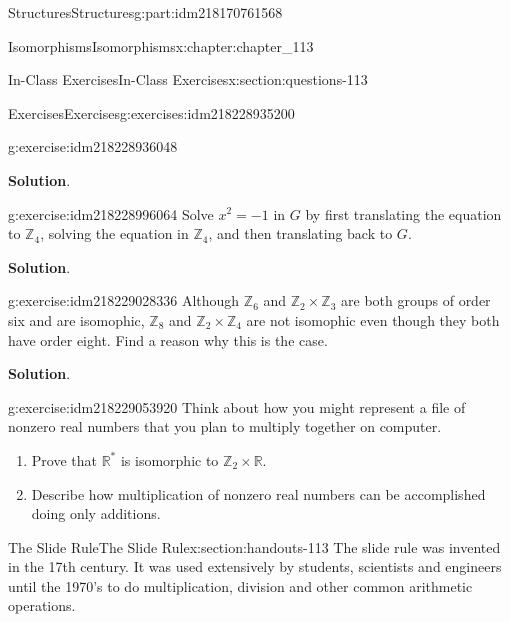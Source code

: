 \documentclass[oneside,10pt,]{book}
\newcommand{\blocktitlefont}{\relax}
\numberwithin{equation}{section}
\begin{document}
\begin{partptx}{Structures}{}{Structures}{}{}{g:part:idm218170761568}
\begin{chapterptx}{Isomorphisms}{}{Isomorphisms}{}{}{x:chapter:chapter_113}
\begin{sectionptx}{In-Class Exercises}{}{In-Class Exercises}{}{}{x:section:questions-113}
\begin{exercises-subsection-numberless}{Exercises}{}{Exercises}{}{}{g:exercises:idm218228935200}
\begin{exercisegroup}
\begin{divisionexerciseeg}{1}{}{}{g:exercise:idm218228936048}
\par\smallskip%
\noindent\textbf{\blocktitlefont Solution}.\hypertarget{g:solution:idm218228975760}{}\quad{}%
\end{divisionexerciseeg}%
\begin{divisionexerciseeg}{2}{}{}{g:exercise:idm218228996064}%
Solve \(x^2= -1\) in \(G\) by first translating the equation to \(\mathbb{Z}_4\), solving the equation in \(\mathbb{Z}_4\), and then translating back to \(G\).%
\par\smallskip%
\noindent\textbf{\blocktitlefont Solution}.\hypertarget{g:solution:idm218229023808}{}\quad{}%
\end{divisionexerciseeg}%
\begin{divisionexerciseeg}{3}{}{}{g:exercise:idm218229028336}%
Although \(\mathbb{Z}_6\) and \(\mathbb{Z}_2 \times \mathbb{Z}_3\) are both groups of order six and are isomophic, \(\mathbb{Z}_8\) and \(\mathbb{Z}_2 \times \mathbb{Z}_4\) are not isomophic even though they both have order eight.  Find a reason why this is the case.%
\par\smallskip%
\noindent\textbf{\blocktitlefont Solution}.\hypertarget{g:solution:idm218229053024}{}\quad{}%
\end{divisionexerciseeg}%
\begin{divisionexerciseeg}{4}{}{}{g:exercise:idm218229053920}%
Think about how you might represent a file of nonzero real numbers that you plan to multiply together on computer.%
\begin{enumerate}[label=(\alph*)]
\item{}Prove that \(\mathbb{R}^*\) is isomorphic to \(\mathbb{Z}_2 \times  \mathbb{R}\).%
\item{}Describe how multiplication of nonzero real numbers can be accomplished doing only additions.%
\end{enumerate}
%
\end{divisionexerciseeg}%
\end{exercisegroup}
\par\medskip\noindent
\end{exercises-subsection-numberless}
\end{sectionptx}
%
%
\typeout{************************************************}
\typeout{************************************************}
%
\begin{sectionptx}{The Slide Rule}{}{The Slide Rule}{}{}{x:section:handouts-113}
The slide rule was invented in the 17th century.  It was used extensively  by students, scientists and engineers until the 1970's to do multiplication, division and other common arithmetic operations.%

\end{sectionptx}
\end{chapterptx}
\end{partptx}
\end{document}
